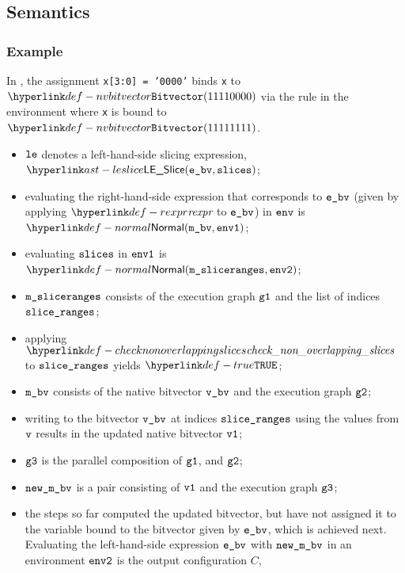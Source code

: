 \subsection{Semantics}
\subsubsection{Example}
In , the assignment \texttt{x[3:0] = '0000'} binds
\texttt{x} to $\nvbitvector(11110000)$
via the rule 
in the environment where \texttt{x} is bound to $\nvbitvector(11111111)$.


\ProseParagraph
\AllApply
\begin{itemize}
  \item $\texttt{le}$ denotes a left-hand-side slicing expression, $\LESlice(\ebv, \slices)$;
  \item evaluating the right-hand-side expression that corresponds to $\texttt{e\_bv}$
  (given by applying $\torexpr$ to $\texttt{e\_bv}$) in $\texttt{env}$
    is $\Normal(\mbv,\envone)$\ProseOrAbnormal;
  \item evaluating $\texttt{slices}$ in $\texttt{env1}$ is $\Normal(\msliceranges, \envtwo)$\ProseOrAbnormal;
  \item $\texttt{m\_sliceranges}$ consists of the execution graph $\texttt{g1}$ and the list of indices\\
         $\texttt{slice\_ranges}$;
  \item applying $\checknonoverlappingslices$ to $\texttt{slice\_ranges}$ yields $\True$\ProseOrError;
  \item $\texttt{m\_bv}$ consists of the native bitvector $\texttt{v\_bv}$ and the execution graph $\texttt{g2}$;
  \item writing to the bitvector $\texttt{v\_bv}$ at indices $\texttt{slice\_ranges}$ using the values from $\texttt{v}$
  results in the updated native bitvector $\texttt{v1}$\ProseOrError;
  \item $\texttt{g3}$ is the parallel composition of $\texttt{g1}$, and $\texttt{g2}$;
  \item $\texttt{new\_m\_bv}$ is a pair consisting of $\texttt{v1}$ and the execution graph $\texttt{g3}$;
  \item the steps so far computed the updated bitvector, but have not assigned it to the
  variable bound to the bitvector given by $\texttt{e\_bv}$, which is achieved next.
  Evaluating the left-hand-side expression $\texttt{e\_bv}$ with
  $\texttt{new\_m\_bv}$ in an environment $\texttt{env2}$ is the output configuration $C$,
\end{itemize}
